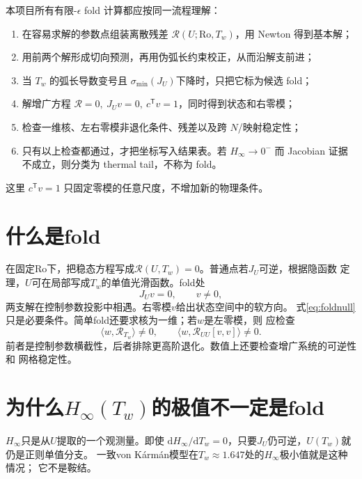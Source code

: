 \documentclass[UTF8,zihao=-4,openany]{ctexbook}
\newcommand{\eps}{\epsilon}
\newcommand{\Ro}{\mathrm{Ro}}
\newcommand{\dd}{\mathrm{d}}
\newcommand{\R}{\mathcal R}
\begin{document}
\begin{derivationbox}
本项目所有有限-$\eps$ fold 计算都应按同一流程理解：
\begin{enumerate}
  \item 在容易求解的参数点组装离散残差 $\R(U;\Ro,T_w)$，用 Newton 得到基本解；
  \item 用前两个解形成切向预测，再用伪弧长约束校正，从而沿解支前进；
  \item 当 $T_w$ 的弧长导数变号且 $\sigma_{\min}(J_U)$下降时，只把它标为候选 fold；
  \item 解增广方程 $\R=0,\ J_Uv=0,\ c^\mathsf{T}v=1$，同时得到状态和右零模；
  \item 检查一维核、左右零模非退化条件、残差以及跨 $N$/映射稳定性；
  \item 只有以上检查都通过，才把坐标写入结果表。若 $H_\infty\to0^-$ 而
  Jacobian 证据不成立，则分类为 thermal tail，不称为 fold。
\end{enumerate}
这里 $c^\mathsf{T}v=1$ 只固定零模的任意尺度，不增加新的物理条件。
\end{derivationbox}

\section{什么是fold}

在固定$\Ro$下，把稳态方程写成$\R(U,T_w)=0$。普通点若$J_U$可逆，根据隐函数
定理，$U$可在局部写成$T_w$的单值光滑函数。fold处
\begin{equation}\label{eq:foldnull}
 \boxed{J_Uv=0,\qquad v\ne0,}
\end{equation}
两支解在控制参数投影中相遇。右零模$v$给出状态空间中的软方向。
式\eqref{eq:foldnull}只是必要条件。简单fold还要求核为一维；若$w$是左零模，则
应检查
\begin{equation}
 \langle w,\R_{T_w}\rangle\ne0,\qquad
 \langle w,\R_{UU}[v,v]\rangle\ne0.
\end{equation}
前者是控制参数横截性，后者排除更高阶退化。数值上还要检查增广系统的可逆性和
网格稳定性。

\section{为什么$H_\infty(T_w)$的极值不一定是fold}

$H_\infty$只是从$U$提取的一个观测量。即使
$\dd H_\infty/\dd T_w=0$，只要$J_U$仍可逆，$U(T_w)$就仍是正则单值分支。
一致von K\'arm\'an模型在$T_w\approx1.647$处的$H_\infty$极小值就是这种情况；
它不是鞍结。
\end{document}
